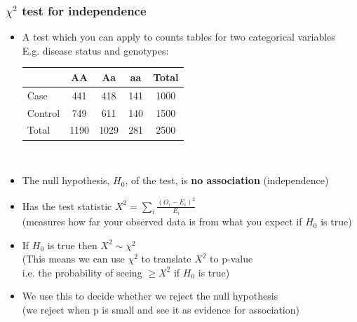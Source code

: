 \documentclass[xcolor=pdftex,dvipsnames,table,10pt]{beamer}
\begin{document}
\begin{frame}
\frametitle{$\chi^2$ test for independence}
\small
  \begin{itemize}\setlength{\itemindent}{-2.25em}
   \item A test which you can apply to counts tables for two categorical variables \\
 \hspace{-0.75cm}E.g. disease status and genotypes:   \\\vspace{.2cm}
   \footnotesize
\hspace{-0.5cm}\begin{tabular}{|l|c|c|c|c|}
\hline
  & AA & Aa & aa & Total \\
\hline
Case & 441 & 418 & 141 & 1000\\
\hline
Control & 749 & 611 & 140 & 1500  \\
\hline
Total & 1190 & 1029 & 281 & 2500\\
\hline
\end{tabular}\\\vspace{0.2cm}
  \item<2-> The null hypothesis, $H_0$, of the test, is \textbf{no association} (independence)
  \item<3-> Has the test statistic $X^2 = \sum_i \frac{(O_i - E_i)^2}{E_i}$\\ %
    \hspace{-0.75cm}(measures how far your observed data is from what you expect if $H_0$ is true) %
   \item<4-> If $H_0$ is true then $X^2 \sim \chi^2$ \\
   \hspace{-0.75cm}(This means we can use $\chi^2$ to translate $X^2$ to p-value\\
   \hspace{-0.75cm}i.e. the probability of seeing $\geq X^2$ if $H_0$ is true)
   \item<5-> We use this to decide whether we reject the null hypothesis\\
   \hspace{-0.75cm}(we reject when p is small and see it as evidence for association)\\
     \end{itemize}
\end{frame}
\end{document}
